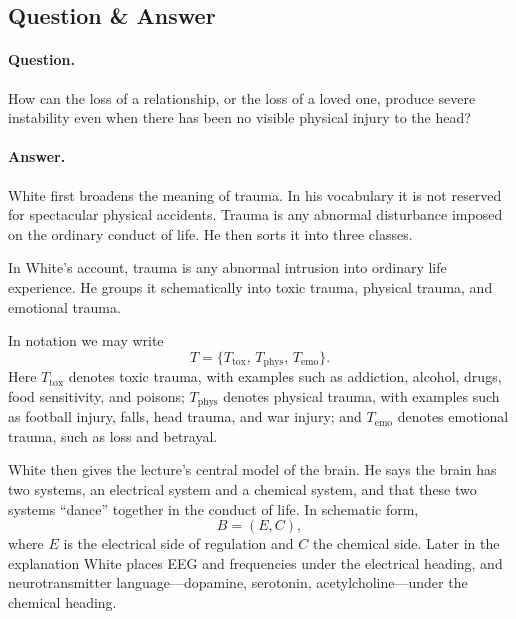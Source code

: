 \subsection{Question \& Answer}

\paragraph{Question.} How can the loss of a relationship, or the loss of a loved one, produce severe instability even when there has been no visible physical injury to the head?

\paragraph{Answer.} White first broadens the meaning of trauma. In his vocabulary it is not reserved for spectacular physical accidents. Trauma is any abnormal disturbance imposed on the ordinary conduct of life. He then sorts it into three classes.

\begin{definition}
In White's account, trauma is any abnormal intrusion into ordinary life experience. He groups it schematically into toxic trauma, physical trauma, and emotional trauma.
\end{definition}

In notation we may write
\begin{equation}
T=\{T_{\mathrm{tox}},\,T_{\mathrm{phys}},\,T_{\mathrm{emo}}\}.
\end{equation}
Here \(T_{\mathrm{tox}}\) denotes toxic trauma, with examples such as addiction, alcohol, drugs, food sensitivity, and poisons; \(T_{\mathrm{phys}}\) denotes physical trauma, with examples such as football injury, falls, head trauma, and war injury; and \(T_{\mathrm{emo}}\) denotes emotional trauma, such as loss and betrayal.

White then gives the lecture's central model of the brain. He says the brain has two systems, an electrical system and a chemical system, and that these two systems ``dance'' together in the conduct of life. In schematic form,
\begin{equation}
B=(E,C),
\end{equation}
where \(E\) is the electrical side of regulation and \(C\) the chemical side. Later in the explanation White places EEG and frequencies under the electrical heading, and neurotransmitter language---dopamine, serotonin, acetylcholine---under the chemical heading.

